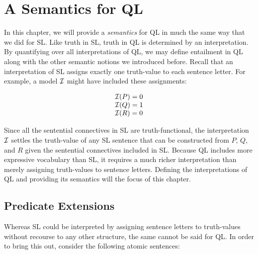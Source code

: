 ﻿%
\chapter{A Semantics for QL}
\label{ch.QL.models}


In this chapter, we will provide a \emph{semantics} for QL in much the same way that we did for SL.
Like truth in SL, truth in QL is determined by an interpretation.
By quantifying over all interpretations of QL, we may define entailment in QL along with the other semantic notions we introduced before.
Recall that an interpretation of SL assigns exactly one truth-value to each sentence letter.
For example, a model $\mathcal{I}$ might have included these assignments:

\begin{displaymath}
	\begin{array}{ll}
    \mathcal{I}(P) = 0\\
    \mathcal{I}(Q) = 1\\
    \mathcal{I}(R) = 0
	\end{array}
\end{displaymath}

Since all the sentential connectives in SL are truth-functional, the interpretation $\mathcal{I}$ settles the truth-value of any SL sentence that can be constructed from $P$, $Q$, and $R$ given the sentential connectives included in SL.
Because QL includes more expressive vocabulary than SL, it requires a much richer interpretation than merely assigning truth-values to sentence letters.
Defining the interpretations of QL and providing its semantics will the focus of this chapter.





\section{Predicate Extensions}

Whereas SL could be interpreted by assigning sentence letters to truth-values without recourse to any other structure, the same cannot be said for QL.
In order to bring this out, consider the following atomic sentences:

